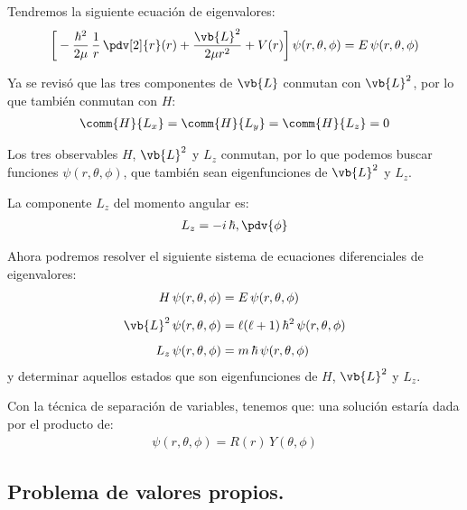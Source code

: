 Tendremos la siguiente ecuación de eigenvalores:
\begin{align}
\bigg[ - \dfrac{\hbar^{2}}{2 \mu} \, \dfrac{1}{r} \, \pdv[2]{r} (r) + \dfrac{\vb{L}^{2}}{2 \mu r^{2}} + V (r) \bigg] \, \psi (r, \theta, \phi) = E \, \psi (r, \theta, \phi) 
\label{eq:ecuacion_08_01_02}
\end{align}

Ya se revisó que las tres componentes de $\vb{L}$ conmutan con $\vb{L}^{2}$, por lo que también conmutan con $H$:
\begin{align}
\comm{H}{L_{x}} = \comm{H}{L_{y}} = \comm{H}{L_{z}} = 0
\label{eq:ecuacion_08_04}
\end{align}

Los tres observables $H$, $\vb{L}^{2}$ y $L_{z}$ conmutan, por lo que podemos buscar funciones $\psi (r, \theta, \phi)$, que también sean eigenfunciones de $\vb{L}^{2}$ y $L_{z}$.
\par
La componente $L_{z}$ del momento angular es:
\begin{align*}
L_{z} = - i \, \hbar , \pdv{\phi}
\end{align*}

Ahora podremos resolver el siguiente sistema de ecuaciones diferenciales de eigenvalores:
\begin{align}
H \, \psi (r, \theta, \phi) &= E \, \psi (r, \theta, \phi) \label{eq:ecuacion_08_05} \\[0.5em]
\vb{L}^{2} \, \psi (r, \theta, \phi) &= \ell (\ell + 1) \, \hbar^{2} \, \psi (r, \theta, \phi) \label{eq:ecuacion_08_06} \\[0.5em]
L_{z} \, \psi (r, \theta, \phi) &= m \, \hbar \, \psi (r, \theta, \phi) \label{eq:ecuacion_08_07}
\end{align}
y determinar aquellos estados que son eigenfunciones de $H$, $\vb{L}^{2}$ y $L_{z}$.
\par
Con la técnica de separación de variables, tenemos que: una solución estaría dada por el producto de:
\begin{align}
\psi (r, \theta, \phi) = R (r) \, Y (\theta, \phi)
\label{eq:ecuacion_08_08}
\end{align}




\subsection{Problema de valores propios.}


